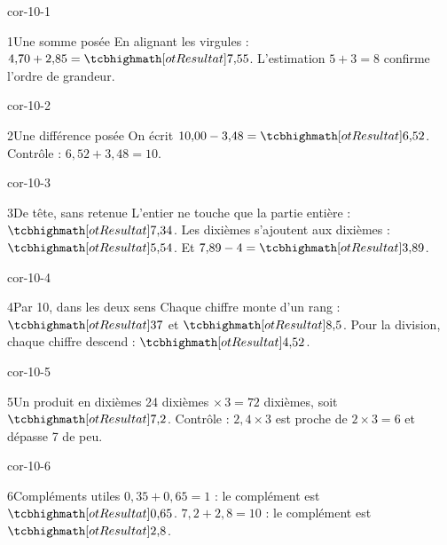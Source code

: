 \clearpage\pagestyle{otMain}\setlength{\otBlocEspacement}{2.5mm}\fontsize{11}{15}\selectfont{}
\begin{blocLivre}{cor-10-1}\begin{corrige}{1}{Une somme posée}
En alignant les virgules : $4{,}70+2{,}85=\res{7{,}55}$. L’estimation $5+3=8$ confirme l’ordre de grandeur.
\end{corrige}\end{blocLivre}
\begin{blocLivre}{cor-10-2}\begin{corrige}{2}{Une différence posée}
On écrit $10{,}00-3{,}48=\res{6{,}52}$. Contrôle : $6{,}52+3{,}48=10$.
\end{corrige}\end{blocLivre}
\begin{blocLivre}{cor-10-3}\begin{corrige}{3}{De tête, sans retenue}
L’entier ne touche que la partie entière : $\res{7{,}34}$. Les dixièmes s’ajoutent aux dixièmes : $\res{5{,}54}$. Et $7{,}89-4=\res{3{,}89}$.
\end{corrige}\end{blocLivre}
\begin{blocLivre}{cor-10-4}\begin{corrige}{4}{Par 10, dans les deux sens}
Chaque chiffre monte d’un rang : $\res{37}$ et $\res{8{,}5}$. Pour la division, chaque chiffre descend : $\res{4{,}52}$.
\end{corrige}\end{blocLivre}
\begin{blocLivre}{cor-10-5}\begin{corrige}{5}{Un produit en dixièmes}
24 dixièmes $\times\,3=72$ dixièmes, soit $\res{7{,}2}$. Contrôle : $2{,}4\times3$ est proche de $2\times3=6$ et dépasse 7 de peu.
\end{corrige}\end{blocLivre}
\begin{blocLivre}{cor-10-6}\begin{corrige}{6}{Compléments utiles}
$0{,}35+0{,}65=1$ : le complément est $\res{0{,}65}$. $7{,}2+2{,}8=10$ : le complément est $\res{2{,}8}$.
\end{corrige}\end{blocLivre}
